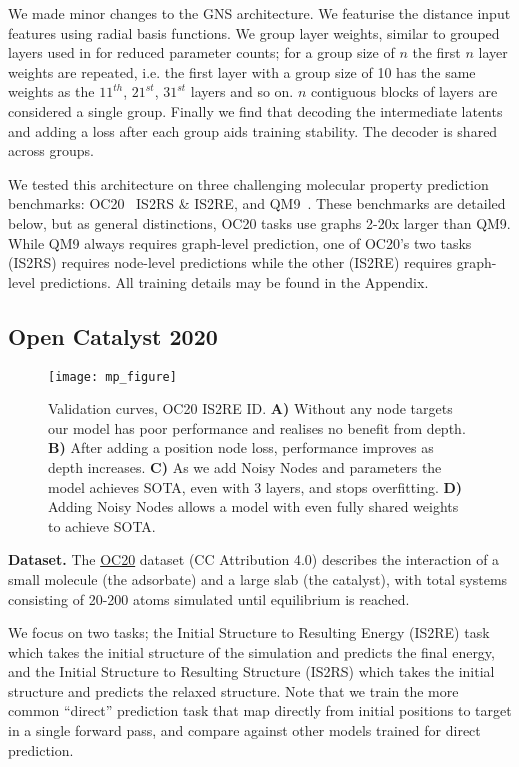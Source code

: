 \documentclass{article} \usepackage{iclr2022_conference,times}
\begin{document}
We made minor changes to the GNS architecture. We featurise the distance input features using radial basis functions. We group layer weights, similar to grouped layers used in \cite{Jumper2021HighlyAP} for reduced parameter counts; for a group size of $n$ the first $n$ layer weights are repeated, i.e. the first layer with a group size of 10 has the same weights as the $\text{11}^{th}$, $\text{21}^{st}$, $\text{31}^{st}$ layers and so on. $n$ contiguous blocks of layers are considered a single group. Finally we find that decoding the intermediate latents and adding a loss after each group aids training stability. The decoder is shared across groups.

We tested this architecture on three challenging molecular property prediction benchmarks:  OC20~\citep{Chanussot2020TheOC} IS2RS \& IS2RE, and QM9~\citep{Ramakrishnan2014QuantumCS}. These benchmarks are detailed below, but as general distinctions, OC20 tasks use graphs 2-20x larger than QM9. While QM9 always requires graph-level prediction, one of OC20's two tasks (IS2RS) requires node-level predictions while the other (IS2RE) requires graph-level predictions. All training details may be found in the Appendix.

\subsection{Open Catalyst 2020}\label{eval-oc}

\begin{figure}[]
    \centering
    \texttt{[image: mp\_figure]}
    \caption{Validation curves, OC20 IS2RE ID. \textbf{A)} Without any node targets our model has poor performance and realises no benefit from depth. \textbf{B)} After adding a position node loss, performance improves as depth increases. \textbf{C)} As we add Noisy Nodes and parameters the model achieves SOTA, even with 3 layers, and stops overfitting. \textbf{D)} Adding Noisy Nodes allows a model with even fully shared weights to achieve SOTA.}
    \label{fig:experimental_results}
\end{figure}


\textbf{Dataset.} The \href{https://opencatalystproject.org/}{OC20} dataset \citep{Chanussot2020TheOC} (CC Attribution 4.0) describes the interaction of a small molecule (the adsorbate) and a large slab (the catalyst), with total systems consisting of 20-200 atoms simulated until equilibrium is reached.

We focus on two tasks; the Initial Structure to Resulting Energy (IS2RE) task which takes the initial structure of the simulation and predicts the final energy, and the Initial Structure to Resulting Structure (IS2RS) which takes the initial structure and predicts the relaxed structure.  Note that we train the more common ``direct'' prediction task that map directly from initial positions to target in a single forward pass, and compare against other models trained for direct prediction.
\end{document}
